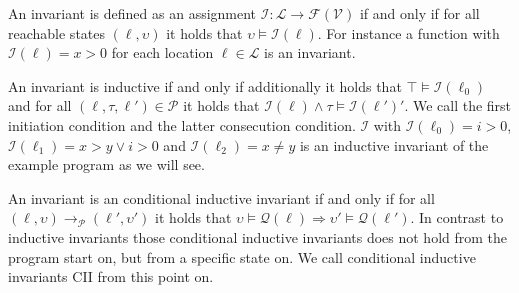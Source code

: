 An invariant is defined as an assignment $\mathcal{I} : \mathcal{L} \rightarrow \mathcal{F}(\mathcal{V})$ if and only if for all reachable states $(\ell, \upsilon)$ it holds that $\upsilon \models \mathcal{I}(\ell)$.
For instance a function with $\mathcal{I}(\ell) = x > 0$ for each location $\ell \in \mathcal{L}$ is an invariant.

An invariant is inductive if and only if additionally it holds that $\top \models \mathcal{I}(\ell_0)$ and for all $(\ell, \tau, \ell') \in \mathcal{P}$ it holds that $\mathcal{I}(\ell) \wedge \tau \models \mathcal{I}(\ell')'$. We call the first initiation condition and the latter consecution condition.
$\mathcal{I}$ with $\mathcal{I}(\ell_0) = i > 0$, $\mathcal{I}(\ell_1) = x > y \vee i > 0$ and $\mathcal{I}(\ell_2) = x \neq y$ is an inductive invariant of the example program as we will see.

An invariant is an conditional inductive invariant if and only if for all $(\ell, \upsilon) \rightarrow_\mathcal{P} (\ell', \upsilon')$ it holds that $\upsilon \models \mathcal{Q}(\ell) \Rightarrow \upsilon' \models \mathcal{Q}(\ell')$.
In contrast to inductive invariants those conditional inductive invariants does not hold from the program start on, but from a specific state on.
We call conditional inductive invariants CII from this point on.
